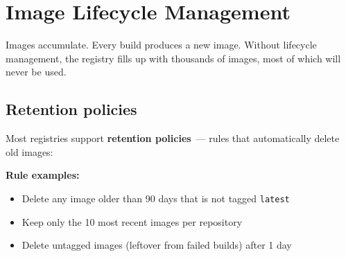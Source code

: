 \begin{codebox}[short]

\begin{Shaded}
\begin{Highlighting}[]
\KeywordTok{{-}}\AttributeTok{ }\KeywordTok{:}
\AttributeTok{  }\KeywordTok{:}

\KeywordTok{{-}}\AttributeTok{ }\KeywordTok{:}
\AttributeTok{  }\KeywordTok{:}
\AttributeTok{  }\KeywordTok{:}
\AttributeTok{    }\KeywordTok{:}
\KeywordTok{: }\CharTok{|}
\AttributeTok{    }\KeywordTok{:}\AttributeTok{ }
\end{Highlighting}
\end{Shaded}

\end{codebox}

\setcounter{section}{6}
\section{Image Lifecycle Management}\label{19-artifact-storage:197-image-lifecycle-management}

Images accumulate. Every build produces a new image. Without lifecycle management, the registry fills up with thousands of images, most of which will never be used.

\subsection*{Retention policies}\label{19-artifact-storage:retention-policies}

Most registries support \textbf{retention policies}~--- rules that automatically delete old images:

\textbf{Rule examples:}

\begin{itemize}
\tightlist
\item
  Delete any image older than 90 days that is not tagged \texttt{latest}
\item
  Keep only the 10 most recent images per repository
\item
  Delete untagged images (leftover from failed builds) after 1 day
\end{itemize}


